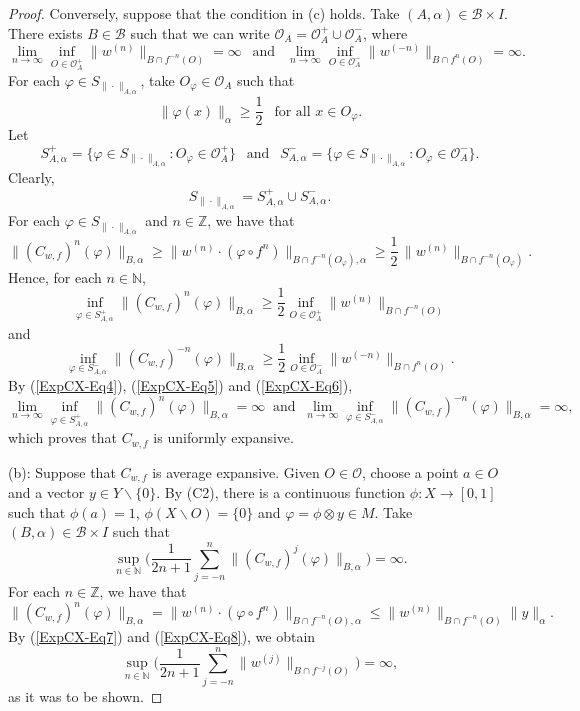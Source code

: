 \documentclass[12pt]{article}
\theoremstyle{plain}
\theoremstyle{definition}
\newcommand{\N}{\mathbb{N}} %
\newcommand{\Z}{\mathbb{Z}} %
\newcommand{\cB}{\mathcal{B}}
\newcommand{\cO}{\mathcal{O}}
\begin{document}
\begin{proof}
Conversely, suppose that the condition in (c) holds. Take $(A,\alpha) \in \cB \times I$.
There exists $B \in \cB$ such that we can write $\cO_A = \cO_A^+ \cup \cO_A^-$, where
\begin{equation}\label{ExpCX-Eq4}
\lim_{n \to \infty} \inf_{O \in \cO_A^+} \|w^{(n)}\|_{B\cap f^{-n}(O)} = \infty \ \ \text{ and } \ \ 
\lim_{n \to \infty} \inf_{O \in \cO_A^-} \|w^{(-n)}\|_{B\cap f^{n}(O)} = \infty.
\end{equation}
For each $\varphi \in S_{\|\cdot\|_{A,\alpha}}$, take $O_\varphi \in \cO_A$ such that
\[
\|\varphi(x)\|_\alpha \geq \frac{1}{2} \ \ \text{ for all } x \in O_\varphi.
\]
Let
\[
S^{+}_{A,\alpha} =\{\varphi \in S_{\|\cdot\|_{A,\alpha}} : O_\varphi \in \cO_A^+\} \ \ \text{ and } \ \
S^{-}_{A,\alpha} =\{\varphi \in S_{\|\cdot\|_{A,\alpha}} : O_\varphi \in \cO_A^-\}.
\]
Clearly, 
\[
S_{\|\cdot\|_{A,\alpha}} = S^{+}_{A,\alpha} \cup S^{-}_{A,\alpha}.
\] 
For each $\varphi \in S_{\|\cdot\|_{A,\alpha}}$ and $n \in \Z$, we have that
\[
\|(C_{w,f})^n(\varphi)\|_{B,\alpha} \geq \|w^{(n)} \cdot (\varphi \circ f^n)\|_{B \cap f^{-n}(O_\varphi),\alpha} 
  \geq \frac{1}{2}\, \|w^{(n)}\|_{B \cap f^{-n}(O_\varphi)}.
\]
Hence, for each $n \in \N$,
\begin{equation}\label{ExpCX-Eq5}
\inf_{\varphi \in S^{+}_{A,\alpha}} \|(C_{w,f})^n(\varphi)\|_{B,\alpha} 
  \geq \frac{1}{2} \inf_{O \in \cO_A^+} \|w^{(n)}\|_{B\cap f^{-n}(O)}
\end{equation}
and
\begin{equation}\label{ExpCX-Eq6}
\inf_{\varphi \in S^{-}_{A,\alpha}} \|(C_{w,f})^{-n}(\varphi)\|_{B,\alpha} 
  \geq \frac{1}{2} \inf_{O \in \cO_A^-} \|w^{(-n)}\|_{B\cap f^n(O)}.
\end{equation}
By (\ref{ExpCX-Eq4}), (\ref{ExpCX-Eq5}) and (\ref{ExpCX-Eq6}),
\[
\lim_{n \to \infty} \inf_{\varphi \in S^{+}_{A,\alpha}} \|(C_{w,f})^n(\varphi)\|_{B,\alpha} = \infty \ \text{ and } \ 
\lim_{n \to \infty} \inf_{\varphi \in S^{-}_{A,\alpha}} \|(C_{w,f})^{-n}(\varphi)\|_{B,\alpha} = \infty,
\]
which proves that $C_{w,f}$ is uniformly expansive.

\smallskip\noindent
(b): Suppose that $C_{w,f}$ is average expansive. Given $O \in \cO$, choose a point $a \in O$ and a vector $y \in Y \backslash \{0\}$.
By (C2), there is a continuous function $\phi : X \to [0,1]$ such that 
$\phi(a) = 1$, $\phi(X \backslash O) = \{0\}$ and $\varphi = \phi \otimes y \in M$.
Take $(B,\alpha) \in \cB \times I$ such that
\begin{equation}\label{ExpCX-Eq7}
\sup_{n \in \N} \Big(\frac{1}{2n+1} \sum_{j=-n}^n \|(C_{w,f})^j(\varphi)\|_{B,\alpha}\Big) = \infty.
\end{equation}
For each $n \in \Z$, we have that
\begin{equation}\label{ExpCX-Eq8}
\|(C_{w,f})^n(\varphi)\|_{B,\alpha} = \|w^{(n)} \cdot (\varphi \circ f^n)\|_{B \cap f^{-n}(O),\alpha} 
  \leq \|w^{(n)}\|_{B \cap f^{-n}(O)} \|y\|_\alpha.
\end{equation}
By (\ref{ExpCX-Eq7}) and (\ref{ExpCX-Eq8}), we obtain
\[
\sup_{n \in \N} \Big(\frac{1}{2n+1} \sum_{j=-n}^n \|w^{(j)}\|_{B \cap f^{-j}(O)}\Big) = \infty,
\]
as it was to be shown.


\end{proof}
\end{document}
